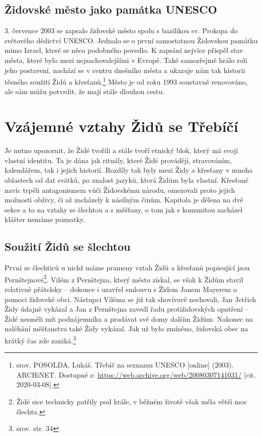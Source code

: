 \documentclass[a4paper,oneside,12pt]{report}
\begin{document}
\section{Židovské město jako památka UNESCO}

3. července 2003 se zapsalo židovské město spolu s bazilikou sv. Prokopa do světového dědictví UNESCO.
Jednalo se o první samostatnou Židovskou památku mimo Izrael, které se něco podobného povedlo.
K zapsání nejvíce přispěl stav města, které bylo mezi nejzachovalejšími v Evropě.
Také samozřejmě hrálo roli jeho postavení, nachází se v centru dnešního města a ukazuje nám tak historii těsného soužití Židů a křesťanů.\footnote{srov. POSOLDA, Lukáš. Třebíč na seznamu UNESCO [online] (2003). ARCHiNET. Dostupné z: \url{https://web.archive.org/web/20080307141031/}  [cit. 2020-03-08].}
Město je od roku 1993 soustavně renovováno, ale sám můžu potvrdit, že mají stále dlouhou cestu.

\chapter{Vzájemné vztahy Židů se Třebíčí}

Je nutno upozornit, že Židé tvořili a stále tvoří etnický blok, který má svojí vlastní identitu.
Ta je dána jak rituály, které Židé provádějí, stravováním, kalendářem, tak i jejich historií.
Rozdíly tak byly mezi Židy a křesťany v mnoha oblastech od dat svátků, po znalost jazyků, která Židům byla vlastní.
Křesťané navíc trpěli antagonismem vůči Židovskému národu, omezovali proto jejich možnosti obživy, či až zacházely k násilným činům.
Kapitola je dělena na dvě sekce a to na vztahy se šlechtou a s měšťany, o tom jak s komunitou zacházel klášter nemáme poznatky.

\section{Soužití Židů se šlechtou}

První ze šlechticů u nichž máme prameny vztah Židů a křesťanů popisující jsou Pernštejnové\footnote{Židé sice technicky patřily pod krále, v běžném životě však měla větší moc šlechta.}.
Vilém z Pernštejna, který město získal, se však k Židům stavil relativně přátelsky -- dokonce i uzavřel smlouvu s Židem Janem Mayerem o pomoci židovské obci.
Nástupci Viléma se již tak shovívavě nechovali, Jan Jetřich Židy údajně vykázal a Jan z Pernštejna zavedl řadu protižidovských opatření -- Židé nesměli mít podnájemníka a prodávat své domy dalším Židům.
Nakonec na naléhání měšťanstva také Židy vykázal.
Jak už bylo zmíněno, židovská obec na krátký čas zde zaniká.\footnote{srov. \cite{Fiser2005} str. 34}
\end{document}
